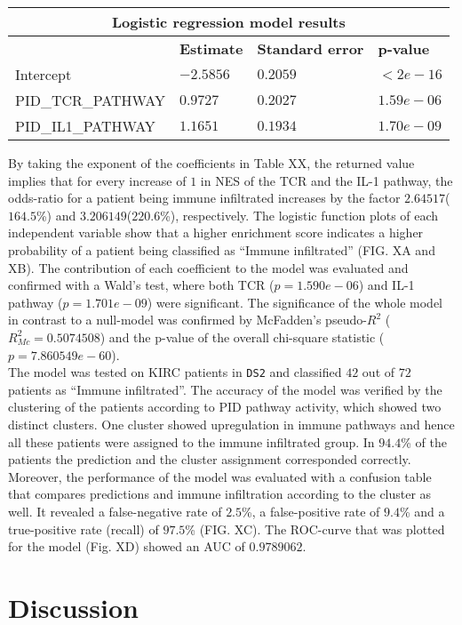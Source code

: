 \documentclass[
  parskip,
  oneside]{scrreprt}
\begin{document}
\begin{tabular}{ |p{4.5cm}||p{3cm}|p{3cm}|p{3cm}|  }
 \hline
 \multicolumn{4}{|c|}{Logistic regression model results} \\
 \hline
  & \textbf{Estimate} & \textbf{Standard error} & \textbf{p-value}\\
 \hline
 Intercept   &  $-2.5856$  & $0.2059$ &   $<2e-16$\\
 PID\_TCR\_PATHWAY &   $0.9727$  & $0.2027$   & $1.59e-06$\\
 PID\_IL1\_PATHWAY & $1.1651$ & $0.1934$ &  $1.70e-09$\\
\hline
\end{tabular}

By taking the exponent of the coefficients in Table XX, the returned
value implies that for every increase of \(1\) in NES of the TCR and the
IL-1 pathway, the odds-ratio for a patient being immune infiltrated
increases by the factor \(2.64517\)(\(164.5\)\%) and
\(3.206149\)(\(220.6\)\%), respectively. The logistic function plots of
each independent variable show that a higher enrichment score indicates
a higher probability of a patient being classified as ``Immune
infiltrated'' (FIG. XA and XB). The contribution of each coefficient to
the model was evaluated and confirmed with a Wald's test, where both TCR
(\(p= 1.590e-06\)) and IL-1 pathway (\(p= 1.701e-09\)) were significant.
The significance of the whole model in contrast to a null-model was
confirmed by McFadden's pseudo-\(R^2\) (\(R_{Mc}^2=0.5074508\)) and the
p-value of the overall chi-square statistic (\(p=7.860549e-60\)).\\
The model was tested on KIRC patients in \texttt{DS2} and classified
\(42\) out of \(72\) patients as ``Immune infiltrated''. The accuracy of
the model was verified by the clustering of the patients according to
PID pathway activity, which showed two distinct clusters. One cluster
showed upregulation in immune pathways and hence all these patients were
assigned to the immune infiltrated group. In \(94.4\)\% of the patients
the prediction and the cluster assignment corresponded correctly.
Moreover, the performance of the model was evaluated with a confusion
table that compares predictions and immune infiltration according to the
cluster as well. It revealed a false-negative rate of \(2.5\)\%, a
false-positive rate of \(9.4\)\% and a true-positive rate (recall) of
\(97.5\)\% (FIG. XC). The ROC-curve that was plotted for the model (Fig.
XD) showed an AUC of \(0.9789062\).

\hypertarget{discussion}{%
\chapter{Discussion}\label{discussion}}
\end{document}
